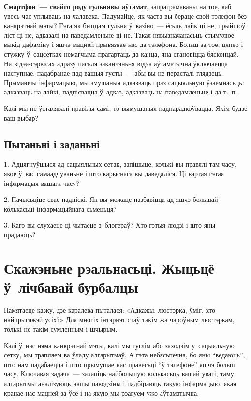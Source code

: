\textbf{Смартфон~--- свайго роду гульнявы аўтамат}, запраграмаваны на тое, каб увесь час уплываць на чалавека. Падумайце, як часта вы бераце свой тэлефон без канкрэтнай мэты? Гэта як быццам гульня ў~казіно~--- ёсьць лайк ці не, прыйшоў ліст ці не, адказалі на паведамленьне ці не. Такая нявызначанасьць стымулюе выкід дафаміну і яшчэ мацней прывязвае нас да тэлефона. Больш за тое, цяпер і стужку ў~сацсетках немагчыма прагартаць да канца, яна становіцца бясконцай. На відэа-сэрвісах адразу пасьля заканчэньня відэа аўтаматычна ўключаецца наступнае, падабранае пад вашыя густы~--- абы вы не перасталі глядзець. Прымаючы інфармацыю, мы змушаныя адказваць праз сацыяльную ўзаемнасьць: адказваць на лайкі, падпісвацца ў~адказ, адказваць на паведамленьне і да т.~п.

Калі мы не ўсталявалі правілы самі, то вымушаныя падпарадкоўвацца. Якім будзе ваш выбар?

\subsection*{Пытаньні і заданьні}

1. Адцягнуўшыся ад сацыяльных сетак, запішыце, колькі вы правялі там часу, якое ў~вас самаадчуваньне і што карыснага вы даведаліся. Ці вартая гэтая інфармацыя вашага часу?

2. Пачысьціце свае падпіскі. Як вы можаце пазбавіцца ад яшчэ большай колькасьці інфармацыйнага сьмецьця?

3. Каго вы слухаеце ці чытаеце з~блогераў? Хто гэтыя людзі і што яны прадаюць?


\section{Скажэньне рэальнасьці. Жыцьцё ў~лічбавай бурбалцы}

Памятаеце казку, дзе каралева пыталася: «Адкажы, люстэрка, ўміг, хто найпрыгажэй усіх?» Для многіх інтэрнэт стаў такім жа чароўным люстэркам, толькі не такім сумленным і шчырым.

Калі ў~нас няма канкрэтнай мэты, калі мы гуглім або заходзім у~сацыяльную сетку, мы трапляем ва ўладу алгарытмаў. А гэта небясьпечна, бо яны ``ведаюць'', што нам падабаецца і што прымушае нас правесьці ``ў тэлефоне'' яшчэ больш часу. Ключавая задача~--- захапіць найбольшую колькасьць вашай увагі, таму алгарытмы аналізуюць нашы паводзіны і падбіраюць такую інфармацыю, якая кранае нас мацней за ўсё і на якую мы рэагуем ужо аўтаматычна.

